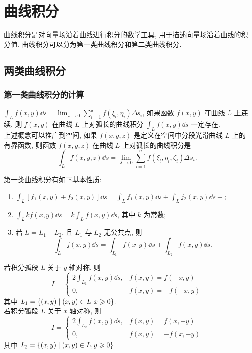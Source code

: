 \section{曲线积分}

曲线积分是对向量场沿着曲线进行积分的数学工具, 用于描述向量场沿着曲线的积分值. 曲线积分可以分为第一类曲线积分和第二类曲线积分.

\subsection{两类曲线积分}

\subsubsection{第一类曲线积分的计算}

\begin{definition}
    $\displaystyle\int_L f(x,y)\dd s=\lim_{\lambda\to0}\sum_{i=1}^{n}f(\xi_i,\eta_i)\Delta s_i$, 如果函数 $f(x,y)$ 在曲线 $L$ 上连续, 
    则 $f(x,y)$ 在曲线 $L$ 上对弧长的曲线积分 $\displaystyle\int_L f(x,y)\dd s$ 一定存在.\\
    上述概念可以推广到空间, 如果 $f(x,y,z)$ 是定义在空间中分段光滑曲线 $L$ 上的有界函数, 则函数 $f(x,y,z)$ 在曲线 $L$ 上对弧长的曲线积分是
    $$\int_Lf(x,y,z)\dd s=\lim_{\lambda\to0}\sum_{i=1}^{n}f(\xi_i,\eta_i,\zeta_i)\Delta s_i.$$
\end{definition}

\begin{theorem}
    第一类曲线积分有如下基本性质:
    \begin{enumerate}[label=(\arabic{*})]
        \item $\displaystyle\int_L [f_1(x,y)\pm f_2(x,y)]\dd s=\int_L f_1(x,y)\dd s+\int_L f_2(x,y)\dd s+$;
        \item $\displaystyle\int_L kf(x,y)\dd s=k\int_L f(x,y)\dd s$, 其中 $k$ 为常数;
        \item 若 $L=L_1+L_2$, 且 $L_1$ 与 $L_2$ 无公共点, 则 $$\int_Lf(x,y)\dd s=\int_{L_1}f(x,y)\dd s+\int_{L_2}f(x,y)\dd s. $$
    \end{enumerate}
\end{theorem}

\begin{theorem}[轴对称性]
    若积分弧段 $L$ 关于 $y$ 轴对称, 则
    $$I=\begin{cases}
            2\displaystyle \int_{L_1}f(x,y)\dd s, & f(x,y)=f(-x,y)  \\
            0,                                    & f(x,y)=-f(-x,y)
        \end{cases}$$
    其中 $L_1=\qty{(x,y)\mid (x,y)\in L,x\geqslant 0}$.\\
    若积分弧段 $L$ 关于 $x$ 轴对称, 则
    $$I=\begin{cases}
            2\displaystyle\int_{L_2}f(x,y)\dd s, & f(x,y)=f(x,-y)  \\
            0,                                   & f(x,y)=-f(x,-y)
        \end{cases}$$
    其中 $L_2=\qty{(x,y)\mid (x,y)\in L,y\geqslant 0}$.
\end{theorem}

